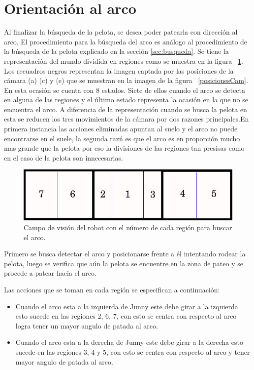 \section{Orientaci\'on al arco}

Al finalizar la búsqueda de la pelota, se desea poder patearla con dirección al arco. El procedimiento para la búsqueda del arco es an\'alogo al procedimiento de la b\'usqueda de la pelota explicado en la sección \ref{sec:busqueda}.
Se tiene la representación del mundo dividida en regiones como se muestra en la figura ~\ref{divisionCamArco}. Los recuadros negros representan la imagen captada por las posiciones de la cámara (a) (c) y (e) que se muestran en la imagen de la figura ~\ref{posicionesCam}. En esta ocasi\'on se cuenta con 8 estados. Siete de ellos cuando el arco se detecta en alguna de las regiones y el último estado representa la ocasión en la que no se encuentra el arco. 
A diferencia de la representaci\'on cuando se busca la pelota en esta se reducen los tres movimientos de la c\'amara por dos razones principales.En primera instancia las acciones eliminadas apuntan al suelo y el arco no puede encontrarse en el suele, la segunda raz\'n es que el arco es en proporci\'on mucho mas grande que la pelota por eso la divisiones de las regiones tan presisas como en el caso de la pelota son innecesarias.
\begin{figure}[hbtp]
\centering
\includegraphics[scale=0.5]{imagenes/RegionesArco.jpg}
\caption{Campo de visión del robot con el número de cada región para buscar el arco. }
\label{divisionCamArco}
\end{figure}

Primero se busca detectar el arco y posicionarse frente a él intentando rodear la pelota, luego se verifica que a\'un la pelota se encuentre en la zona de pateo y se procede a patear hacia el arco.

Las acciones que se toman en cada regi\'on se especifican a continuación: 
 \begin{itemize}

\item Cuando el arco esta a la izquierda de Junny este debe girar a la izquierda esto sucede en las regiones 2, 6, 7, con esto se centra con respecto al arco logra tener un mayor angulo de patada al arco.

\item Cuando el arco esta a la derecha de Junny este debe girar a la derecha esto sucede en las regiones 3, 4 y 5, con esto se centra con respecto al arco y tener mayor angulo de patada al arco.


\end{itemize}


